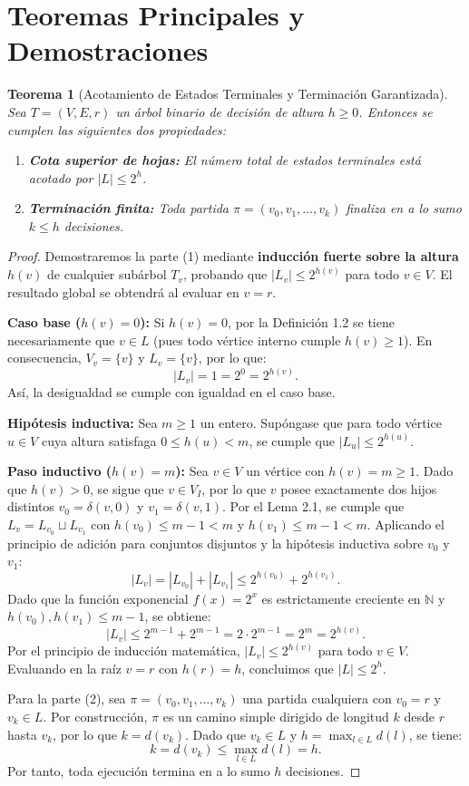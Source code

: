 \documentclass[11pt, a4paper]{article}
\theoremstyle{definition}
\theoremstyle{plain}
\newtheorem{theorem}{Teorema}[section]
\begin{document}
\section{Teoremas Principales y Demostraciones}

\begin{theorem}[Acotamiento de Estados Terminales y Terminación Garantizada]
Sea $T = (V, E, r)$ un árbol binario de decisión de altura $h \geq 0$. Entonces se cumplen las siguientes dos propiedades:
\begin{enumerate}[noitemsep, topsep=2pt]
    \item \textbf{Cota superior de hojas:} El número total de estados terminales está acotado por $|L| \leq 2^h$.
    \item \textbf{Terminación finita:} Toda partida $\pi = (v_0, v_1, \dots, v_k)$ finaliza en a lo sumo $k \leq h$ decisiones.
\end{enumerate}
\end{theorem}

\begin{proof}
Demostraremos la parte (1) mediante \textbf{inducción fuerte sobre la altura $h(v)$} de cualquier subárbol $T_v$, probando que $|L_v| \leq 2^{h(v)}$ para todo $v \in V$. El resultado global se obtendrá al evaluar en $v = r$.

\textbf{Caso base ($h(v) = 0$):} Si $h(v) = 0$, por la Definición 1.2 se tiene necesariamente que $v \in L$ (pues todo vértice interno cumple $h(v) \geq 1$). En consecuencia, $V_v = \{v\}$ y $L_v = \{v\}$, por lo que:
\[
    |L_v| = 1 = 2^0 = 2^{h(v)}.
\]
Así, la desigualdad se cumple con igualdad en el caso base.

\textbf{Hipótesis inductiva:} Sea $m \geq 1$ un entero. Supóngase que para todo vértice $u \in V$ cuya altura satisfaga $0 \leq h(u) < m$, se cumple que $|L_u| \leq 2^{h(u)}$.

\textbf{Paso inductivo ($h(v) = m$):} Sea $v \in V$ un vértice con $h(v) = m \geq 1$. Dado que $h(v) > 0$, se sigue que $v \in V_I$, por lo que $v$ posee exactamente dos hijos distintos $v_0 = \delta(v, 0)$ y $v_1 = \delta(v, 1)$. Por el Lema 2.1, se cumple que $L_v = L_{v_0} \sqcup L_{v_1}$ con $h(v_0) \leq m - 1 < m$ y $h(v_1) \leq m - 1 < m$. Aplicando el principio de adición para conjuntos disjuntos y la hipótesis inductiva sobre $v_0$ y $v_1$:
\[
    |L_v| = |L_{v_0}| + |L_{v_1}| \leq 2^{h(v_0)} + 2^{h(v_1)}.
\]
Dado que la función exponencial $f(x) = 2^x$ es estrictamente creciente en $\mathbb{N}$ y $h(v_0), h(v_1) \leq m - 1$, se obtiene:
\[
    |L_v| \leq 2^{m - 1} + 2^{m - 1} = 2 \cdot 2^{m - 1} = 2^m = 2^{h(v)}.
\]
Por el principio de inducción matemática, $|L_v| \leq 2^{h(v)}$ para todo $v \in V$. Evaluando en la raíz $v = r$ con $h(r) = h$, concluimos que $|L| \leq 2^h$.

Para la parte (2), sea $\pi = (v_0, v_1, \dots, v_k)$ una partida cualquiera con $v_0 = r$ y $v_k \in L$. Por construcción, $\pi$ es un camino simple dirigido de longitud $k$ desde $r$ hasta $v_k$, por lo que $k = d(v_k)$. Dado que $v_k \in L$ y $h = \max_{l \in L} d(l)$, se tiene:
\[
    k = d(v_k) \leq \max_{l \in L} d(l) = h.
\]
Por tanto, toda ejecución termina en a lo sumo $h$ decisiones.
\end{proof}
\end{document}
